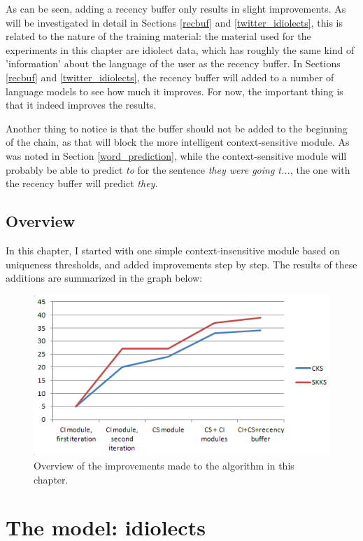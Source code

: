 \documentclass[11pt]{article}
\begin{document}
As can be seen, adding a recency buffer only results in slight improvements. As will be investigated in detail in Sections \ref{recbuf} and \ref{twitter_idiolects}, this is related to the nature of the training material: the material used for the experiments in this chapter are idiolect data, which has roughly the same kind of 'information' about the language of the user as the recency buffer. In Sections \ref{recbuf} and \ref{twitter_idiolects}, the recency buffer will added to a number of language models to see how much it improves. For now, the important thing is that it indeed improves the results. 

Another thing to notice is that the buffer should not be added to the beginning of the chain, as that will block the more intelligent context-sensitive module. As was noted in Section \ref{word_prediction}, while the context-sensitive module will probably be able to predict \emph{to} for the sentence \emph{they were going t...}, the one with the recency buffer will predict \emph{they}.

\subsection{Overview}
In this chapter, I started with one simple context-insensitive module based on uniqueness thresholds, and added improvements step by step. The results of these additions are summarized in the graph below:

\begin{figure}[H] \centering
\includegraphics[scale=1]{overview}
\caption{Overview of the improvements made to the algorithm in this chapter.}
\label{overview}
\end{figure} 






\section{The model: idiolects} \label{model}
\end{document}

